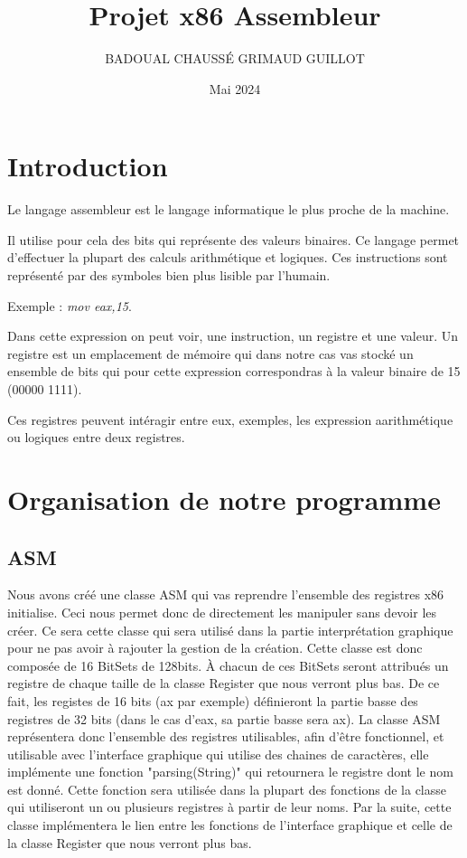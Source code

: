 \documentclass{article}
\title{Projet x86 Assembleur}
\author{BADOUAL CHAUSSÉ GRIMAUD GUILLOT}
\date{Mai 2024}
\begin{document}
\maketitle

\section{Introduction}
Le langage assembleur est le langage informatique le plus proche de la machine.

Il utilise pour cela des bits qui représente des valeurs binaires. Ce langage permet d'effectuer la plupart des calculs arithmétique et logiques. Ces instructions sont représenté par des symboles bien plus lisible par l'humain.

Exemple : \emph{mov eax,15}.

Dans cette expression on peut voir, une instruction, un registre et une valeur. Un registre est un emplacement de mémoire qui dans notre cas vas stocké un ensemble de bits qui pour cette expression correspondras à la valeur binaire de 15 (00000 1111).

Ces registres peuvent intéragir entre eux, exemples, les expression aarithmétique ou logiques entre deux registres.

\section{Organisation de notre programme}
\subsection{ASM}
Nous avons créé une classe ASM qui vas reprendre l'ensemble des registres x86 initialise. Ceci nous permet donc de directement les manipuler sans devoir les créer. Ce sera cette classe qui sera utilisé dans la partie interprétation graphique pour ne pas avoir à rajouter la gestion de la création.
Cette classe est donc composée de 16 BitSets de 128bits. À chacun de ces BitSets seront attribués un registre de chaque taille de la classe Register que nous verront plus bas. De ce fait, les registes de 16 bits (ax par exemple) définieront la partie basse des registres de 32 bits (dans le cas d'eax, sa partie basse sera ax).
La classe ASM représentera donc l'ensemble des registres utilisables, afin d'être fonctionnel, et utilisable avec l'interface graphique qui utilise des chaines de caractères, elle implémente une fonction "parsing(String)" qui retournera le registre dont le nom est donné.
Cette fonction sera utilisée dans la plupart des fonctions de la classe qui utiliseront un ou plusieurs registres à partir de leur noms. Par la suite, cette classe implémentera le lien entre les fonctions de l'interface graphique et celle de la classe Register que nous verront plus bas.
\end{document}
